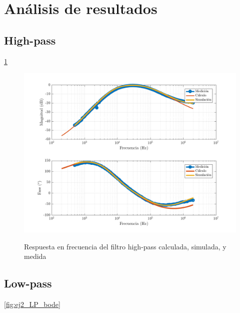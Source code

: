 \section{An\'alisis de resultados}

\subsection{High-pass}

\ref{fig:ej2_HP_bode}

\begin{figure}
	\includegraphics[width=\textwidth]{imagenes/HP_bode}
	\label{fig:ej2_HP_bode}
	\caption{Respuesta en frecuencia del filtro high-pass calculada, simulada, y medida}
\end{figure}

\subsection{Low-pass}

\ref{fig:ej2_LP_bode}

